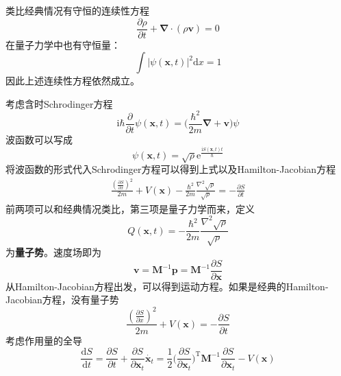 \documentclass[12pt]{article}
\begin{document}
    类比经典情况有守恒的连续性方程
    \begin{equation*}
        \frac {\partial \rho}{\partial t} + \bm{\nabla} \cdot (\rho \bm{v}) = 0
    \end{equation*}
    在量子力学中也有守恒量：
    \begin{equation*}
        \int |\psi(\bm{x},t)|^2 \mathrm{d}x = 1
    \end{equation*}
    因此上述连续性方程依然成立。

    考虑含时Schrodinger方程
    \begin{equation*}
        \mathrm{i}\hbar \frac {\partial}{\partial t} \psi(\bm{x},t) = \bigg(\frac {\hbar^2}{2m}\bm{\nabla + \bm{v}}\bigg)\psi
    \end{equation*}
    波函数可以写成
    \begin{equation*}
        \psi(\bm{x},t) = \sqrt{\rho} \mathrm{e}^{\frac {\mathrm{i}S(\bm{x},t)t}{\hbar}}
    \end{equation*}
    将波函数的形式代入Schrodinger方程可以得到上式以及Hamilton-Jacobian方程
    \begin{align*}
        \frac {(\frac {\partial S}{\partial x})^2}{2m} + V(\bm{x}) - \frac {\hbar^2}{2m} \frac {\nabla^2 \sqrt{\rho}}{\sqrt{\rho}} = -\frac {\partial S}{\partial t}
    \end{align*}
    前两项可以和经典情况类比，第三项是量子力学而来，定义
    \begin{equation*}
        Q(\bm{x},t) = - \frac {\hbar^2}{2m} \frac {\nabla^2 \sqrt{\rho}}{\sqrt{\rho}}
    \end{equation*}
    为\textbf{量子势}。速度场即为
    \begin{equation*}
        \bm{v} = \bm{M}^{-1}\bm{p} = \bm{M}^{-1}\frac {\partial S}{\partial \bm{x}}
    \end{equation*}
    从Hamilton-Jacobian方程出发，可以得到运动方程。如果是经典的Hamilton-Jacobian方程，没有量子势
    \begin{equation*}
        \frac {(\frac {\partial S}{\partial x})^2}{2m} + V(\bm{x}) = -\frac {\partial S}{\partial t}
    \end{equation*}
    考虑作用量的全导
    \begin{equation*}
        \frac {\mathrm{d}S}{\mathrm{d}t} = \frac {\partial S}{\partial t} + \frac {\partial S}{\partial \bm{x}_t} \dot{\bm{x}_t} = \frac 12 \bigg(\frac {\partial S}{\partial \bm{x}_t}\bigg)^{\mathrm{T}} \bm{M}^{-1} \frac {\partial S}{\partial \bm{x}_t} - V(\bm{x})
    \end{equation*}
\end{document}
